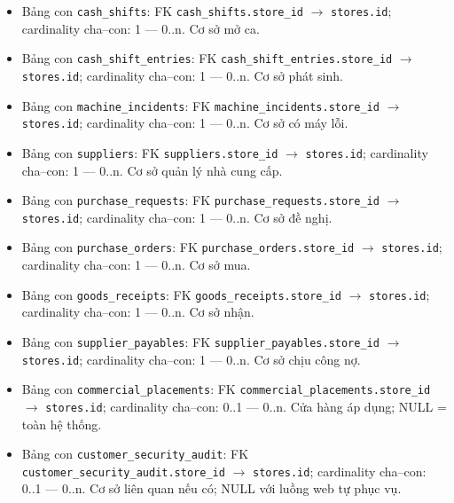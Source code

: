 \begin{itemize}
\item Bảng con \texttt{cash\_shifts}: FK \texttt{cash\_shifts.store\_id} $\rightarrow$ \texttt{stores.id}; cardinality cha--con: 1 — 0..n. Cơ sở mở ca.

\item Bảng con \texttt{cash\_shift\_entries}: FK \texttt{cash\_shift\_entries.store\_id} $\rightarrow$ \texttt{stores.id}; cardinality cha--con: 1 — 0..n. Cơ sở phát sinh.

\item Bảng con \texttt{machine\_incidents}: FK \texttt{machine\_incidents.store\_id} $\rightarrow$ \texttt{stores.id}; cardinality cha--con: 1 — 0..n. Cơ sở có máy lỗi.

\item Bảng con \texttt{suppliers}: FK \texttt{suppliers.store\_id} $\rightarrow$ \texttt{stores.id}; cardinality cha--con: 1 — 0..n. Cơ sở quản lý nhà cung cấp.

\item Bảng con \texttt{purchase\_requests}: FK \texttt{purchase\_requests.store\_id} $\rightarrow$ \texttt{stores.id}; cardinality cha--con: 1 — 0..n. Cơ sở đề nghị.

\item Bảng con \texttt{purchase\_orders}: FK \texttt{purchase\_orders.store\_id} $\rightarrow$ \texttt{stores.id}; cardinality cha--con: 1 — 0..n. Cơ sở mua.

\item Bảng con \texttt{goods\_receipts}: FK \texttt{goods\_receipts.store\_id} $\rightarrow$ \texttt{stores.id}; cardinality cha--con: 1 — 0..n. Cơ sở nhận.

\item Bảng con \texttt{supplier\_payables}: FK \texttt{supplier\_payables.store\_id} $\rightarrow$ \texttt{stores.id}; cardinality cha--con: 1 — 0..n. Cơ sở chịu công nợ.

\item Bảng con \texttt{commercial\_placements}: FK \texttt{commercial\_placements.store\_id} $\rightarrow$ \texttt{stores.id}; cardinality cha--con: 0..1 — 0..n. Cửa hàng áp dụng; NULL = toàn hệ thống.

\item Bảng con \texttt{customer\_security\_audit}: FK \texttt{customer\_security\_audit.store\_id} $\rightarrow$ \texttt{stores.id}; cardinality cha--con: 0..1 — 0..n. Cơ sở liên quan nếu có; NULL với luồng web tự phục vụ.

\end{itemize}

